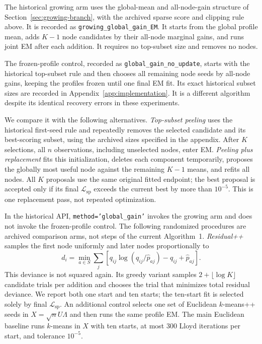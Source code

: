 \documentclass[11pt]{article}
\theoremstyle{definition}
\theoremstyle{remark}
\numberwithin{equation}{section}
\begin{document}
The historical growing arm uses the global-mean and all-node-gain structure of Section~\ref{sec:growing-branch}, with the archived sparse score and clipping rule above. It is recorded as
\texttt{growing\_global\_gain\_EM}. It starts from the global profile mean,
adds $K-1$ node candidates by their all-node marginal gains, and runs joint
EM after each addition. It requires no top-subset size and removes no nodes.

The frozen-profile control, recorded as \texttt{global\_gain\_no\_update},
starts with the historical top-subset rule and then chooses all remaining
node seeds by all-node gains, keeping the profiles frozen until one final EM
fit. Its exact historical subset sizes are recorded in
Appendix~\ref{app:implementation}. It is a different algorithm despite its
identical recovery errors in these experiments.

We compare it with the following alternatives. \emph{Top-subset peeling}
uses the historical first-seed rule and repeatedly removes the selected candidate and its best-scoring subset, using the archived sizes specified in the appendix.
After $K$ selections, all $n$ observations, including unselected nodes, enter
EM. \emph{Peeling plus replacement} fits this initialization, deletes each
component temporarily, proposes the globally most useful node against the
remaining $K-1$ means, and refits all nodes. All $K$ proposals use the same
original fitted endpoint; the best proposal is accepted only if its final
$\mathcal L_{\mathrm{sp}}$ exceeds the current best by more than $10^{-5}$. This is one
replacement pass, not repeated optimization.

In the historical API, \texttt{method='global\_gain'} invokes the growing arm and does not invoke the frozen-profile control. The following randomized procedures are archived comparison arms, not steps of the current Algorithm~1. \emph{Residual++} samples
the first node uniformly and later nodes proportionally to
\begin{equation}
 d_i=\min_{a\in S}\sum_j
 \left[q_{ij}\log(q_{ij}/\widehat p_{aj})-q_{ij}+\widehat p_{aj}\right].
\end{equation}
This deviance is not squared again. Its greedy variant samples
$2+\lfloor\log K\rfloor$ candidate trials per addition and chooses the trial
that minimizes total residual deviance. We report both one start and ten
starts; the ten-start fit is selected solely by final $\mathcal L_{\mathrm{sp}}$.
An additional control selects one set of Euclidean $k$-means++ seeds in
$X=\sqrt n U\Lambda$ and then runs the same profile EM.
The main Euclidean baseline runs $k$-means in $X$ with ten starts, at most
300 Lloyd iterations per start, and tolerance $10^{-5}$.
\end{document}
